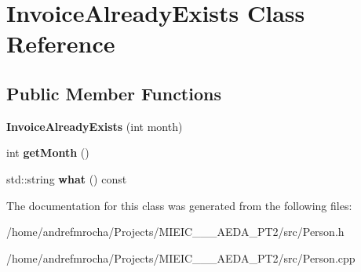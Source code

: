 \hypertarget{class_invoice_already_exists}{}\section{Invoice\+Already\+Exists Class Reference}
\label{class_invoice_already_exists}
\subsection*{Public Member Functions}
\begin{DoxyCompactItemize}
\item 
\mbox{\label{class_invoice_already_exists_ae5d642f496997633c4a4dbc3c8347374}} 
{\bfseries Invoice\+Already\+Exists} (int month)
\item 
\mbox{\label{class_invoice_already_exists_a75da257c1dfbaa7cacf89e79c759eb43}} 
int {\bfseries get\+Month} ()
\item 
\mbox{\label{class_invoice_already_exists_ae0239e7ba5445491a3182d77d34b1505}} 
std\+::string {\bfseries what} () const
\end{DoxyCompactItemize}


The documentation for this class was generated from the following files\+:\begin{DoxyCompactItemize}
\item 
/home/andrefmrocha/\+Projects/\+M\+I\+E\+I\+C\+\_\+\_\+\_\+\+A\+E\+D\+A\+\_\+\+P\+T2/src/Person.\+h\item 
/home/andrefmrocha/\+Projects/\+M\+I\+E\+I\+C\+\_\+\_\+\_\+\+A\+E\+D\+A\+\_\+\+P\+T2/src/Person.\+cpp\end{DoxyCompactItemize}
